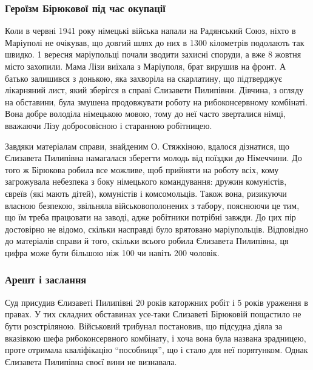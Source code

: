 \subsubsection{Героїзм Бірюкової під час окупації}

Коли в червні 1941 року німецькі війська напали на Радянський Союз, ніхто в
Маріуполі не очікував, що довгий шлях до них в 1300 кілометрів подолають так
швидко. 1 вересня маріупольці почали зводити захисні споруди, а вже 8 жовтня
місто захопили. Мама Лізи виїхала з Маріуполя, брат вирушив на фронт. А батько
залишився з донькою, яка захворіла на скарлатину, що підтверджує лікарняний
лист, який зберігся в справі Єлизавети Пилипівни. Дівчина, з огляду на
обставини, була змушена продовжувати роботу на рибоконсервному комбінаті. Вона
добре володіла німецькою мовою, тому до неї часто зверталися німці, вважаючи
Лізу добросовісною і старанною робітницею.


Завдяки матеріалам справи, знайденим О. Стяжкіною, вдалося дізнатися, що
Єлизавета Пилипівна намагалася зберегти молодь від поїздки до Німеччини. До
того ж Бірюкова робила все можливе, щоб прийняти на роботу всіх, кому
загрожувала небезпека з боку німецького командування: дружин комуністів, євреїв
(які мають дітей), комуністів і комсомольців. Також вона, ризикуючи власною
безпекою, звільняла військовополонених з табору, пояснюючи це тим, що їм треба
працювати на заводі, адже робітники потрібні завжди. До цих пір достовірно не
відомо, скільки насправді було врятовано маріупольців. Відповідно до матеріалів
справи й того, скільки всього робила Єлизавета Пилипівна, ця цифра може бути
більшою ніж 100 чи навіть 200 чоловік.


\subsubsection{Арешт і заслання}

Суд присудив Єлизаветі Пилипівні 20 років каторжних робіт і 5 років ураження в
правах. У тих складних обставинах усе-таки Єлизаветі Бірюковій пощастило не
бути розстріляною. Військовий трибунал постановив, що підсудна діяла за
вказівкою шефа рибоконсервного комбінату, і хоча вона була названа зрадницею,
проте отримала кваліфікацію \enquote{пособниця}, що і стало для неї порятунком.
Однак Єлизавета Пилипівна своєї вини не визнавала.

